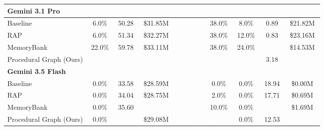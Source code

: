 \begin{table}[htbp]
\begin{tabular}{l c c c c c c c c}
\midrule

\multicolumn{9}{l}{\textbf{Gemini 3.1 Pro}} \\
\midrule
\quad Baseline                      & 6.0\% & 50.28 & \$31.85M & \cellcolor{GoogleRed}\textcolor{white}{\textbf{100.0\%}} & 38.0\% & 8.0\% & 0.89 & \$21.82M \\
\quad RAP~\citep{kagaya2024rap}             & 6.0\% & 51.34 & \$32.27M & \cellcolor{GoogleRed}\textcolor{white}{\textbf{100.0\%}} & 38.0\% & 12.0\% & 0.83 & \$23.16M \\
\quad MemoryBank~\citep{zhong2024memorybank}          & 22.0\% & 59.78 & \$33.11M & \cellcolor{GoogleRed}\textcolor{white}{\textbf{100.0\%}} & 38.0\% & 24.0\% & \cellcolor{GoogleRed}\textcolor{white}{\textbf{0.39}} & \$14.53M \\
\quad Procedural Graph (Ours)           & \cellcolor{GoogleRed}\textcolor{white}{\textbf{34.0\%}} & \cellcolor{GoogleRed}\textcolor{white}{\textbf{79.22}} & \cellcolor{GoogleRed}\textcolor{white}{\textbf{\$37.21M}} & \cellcolor{GoogleRed}\textcolor{white}{\textbf{100.0\%}} & \cellcolor{GoogleRed}\textcolor{white}{\textbf{54.0\%}} & \cellcolor{GoogleRed}\textcolor{white}{\textbf{46.0\%}} & 3.18 & \cellcolor{GoogleRed}\textcolor{white}{\textbf{\$38.20M}} \\

\midrule

\multicolumn{9}{l}{\textbf{Gemini 3.5 Flash}} \\
\midrule
\quad Baseline                      & 0.0\% & 33.58 & \$28.59M & \cellcolor{GoogleRed}\textcolor{white}{\textbf{100.0\%}} & 0.0\%  & 0.0\%  & 18.94 & \$0.00M \\
\quad RAP~\citep{kagaya2024rap}              & 0.0\% & 34.04 & \$28.75M & \cellcolor{GoogleRed}\textcolor{white}{\textbf{100.0\%}} & 2.0\%  & 0.0\%  & 17.71 & \$0.69M \\
\quad MemoryBank~\citep{zhong2024memorybank}          & 0.0\% & 35.60 & \cellcolor{GoogleRed}\textcolor{white}{\textbf{\$29.34M}} & \cellcolor{GoogleRed}\textcolor{white}{\textbf{100.0\%}} & 10.0\% & 0.0\%  & \cellcolor{GoogleRed}\textcolor{white}{\textbf{11.99}} & \$1.69M \\
\quad Procedural Graph (Ours)           & 0.0\% & \cellcolor{GoogleRed}\textcolor{white}{\textbf{40.62}} & \$29.08M & \cellcolor{GoogleRed}\textcolor{white}{\textbf{100.0\%}} & \cellcolor{GoogleRed}\textcolor{white}{\textbf{14.0\%}} & 0.0\%  & 12.53 & \cellcolor{GoogleRed}\textcolor{white}{\textbf{\$9.39M}} \\


\end{tabular}
\end{table}

